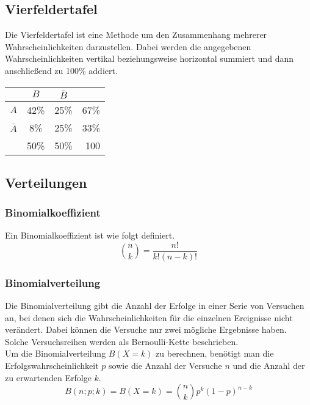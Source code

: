 \documentclass[a4paper]{article}
\begin{document}
		\subsection{Vierfeldertafel}
			Die Vierfeldertafel ist eine Methode um den Zusammenhang mehrerer Wahrscheinlichkeiten darzustellen. Dabei werden die angegebenen Wahrscheinlichkeiten vertikal beziehungsweise horizontal summiert und dann anschließend zu 100\% addiert.
			
			\setlength{\tabcolsep}{10pt}
			\renewcommand{\arraystretch}{1.5}
			\begin{center}
				\begin{tabular}{ l | c | c | r }
									& $B$ 	& $\overline{B}$ 	& 		\\ \hline
					$A$ 			& 42\% 	& 25\% 				& 67\%	\\ \hline
					$\overline{A}$ 	& 8\% 	& 25\%				& 33\% 	\\ \hline
					& 50\% 	& 50\% 				& 100
				\end{tabular}
			\end{center}
		\subsection{Verteilungen}
			\subsubsection{Binomialkoeffizient}
				Ein Binomialkoeffizient ist wie folgt definiert.
				\begin{equation}
					\binom{n}{k} = \frac{n!}{k! (n-k)!}
				\end{equation}
			\subsubsection{Binomialverteilung}
				Die Binomialverteilung gibt die Anzahl der Erfolge in einer Serie von Versuchen an, bei denen sich die Wahrscheinlichkeiten für die einzelnen Ereignisse nicht verändert. Dabei können die Versuche nur zwei mögliche Ergebnisse haben. Solche Versuchsreihen werden als Bernoulli-Kette beschrieben.\\
				Um die Binomialverteilung $B(X = k)$ zu berechnen, benötigt man die Erfolgswahrscheinlichkeit $p$ sowie die Anzahl der Versuche $n$ und die Anzahl der zu erwartenden Erfolge $k$.
				\begin{equation}
					B(n; p; k) = B(X = k) = \binom{n}{k} p^k (1 - p)^{n-k}
				\end{equation}
\end{document}
